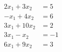 \begin{align*}
2x_1  + 3x_2  &= 5 \\
-x_1 + 4x_2  &=  6 \\
3x_1 +10x_2  &=  2  \\
3x_1 - x_2  &=  -1  \\
6x_1 + 9x_2  &=  3  
\end{align*}